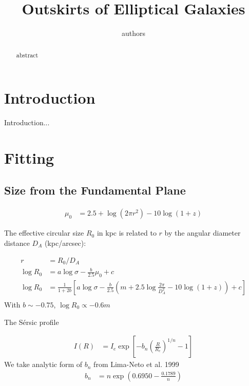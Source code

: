 \documentclass{aastex}
\newcommand{\sersic}{S\'ersic}
\begin{document}
\title{Outskirts of Elliptical Galaxies}
\author{authors}


\begin{abstract}
    abstract    
\end{abstract}    


\section{Introduction}
Introduction...


\section{Fitting}
\subsection{Size from the Fundamental Plane}

\begin{eqnarray}
       \mu_0 &= 2.5 + \log(2 \pi r^2) - 10 \log(1+z)
   \end{eqnarray}   

The effective circular size $R_0$ in kpc is related to $r$ by
the angular diameter distance $D_A$ (kpc/arcsec):

\begin{align}
    r &= R_0 / D_A \\
    \log R_0 &= a \log \sigma - \frac{b}{2.5} \mu_0 + c \\
    \log R_0 &= \frac{1}{1 + 2 b} \left[ a\log \sigma
        - \frac{b}{2.5} \left(m + 2.5\log \frac{2\pi}{D_A^2} - 10 \log (1+z)\right)
        + c \right]\\
\end{align}
With $b \sim -0.75$, $\log R_0 \propto -0.6 m$


The \sersic{} profile

\begin{align}
    I(R) &= I_e \exp \left[ -b_n \left( \frac{R}{R_e} \right)^{1/n} - 1 \right]
\end{align}
We take analytic form of $b_n$ from Lima-Neto et al. 1999
\begin{align}
    b_n &= n \exp\left(0.6950 - \frac{0.1789}{n}\right)
\end{align}
\end{document}
